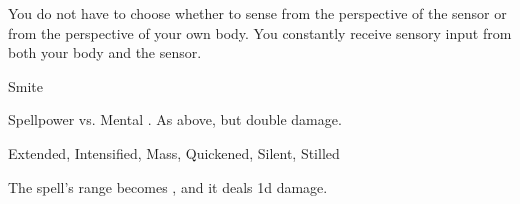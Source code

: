 You do not have to choose whether to sense from the perspective of the sensor or from the perspective of your own body.
You constantly receive sensory input from both your body and the sensor.
\begin{spellsection}{Smite}
\begin{spellheader}
\end{spellheader}
\begin{spellcontent}
\begin{spelltargetinginfo}
\end{spelltargetinginfo}
\begin{spelleffects}
\begin{spellattack}{Spellpower vs. Mental}
\spellsuccess {}.
\spellcritical As above, but double damage.
\end{spellattack}
\end{spelleffects}
\end{spellcontent}
\begin{spellfooter}
 Extended, Intensified, Mass, Quickened, Silent, Stilled
\end{spellfooter}
\begin{spellsubcontent}
\begin{spellcantrip}
The spell's range becomes \rngclose, and it deals \minus1d damage.
\end{spellcantrip}
\end{spellsubcontent}
\end{spellsection}

